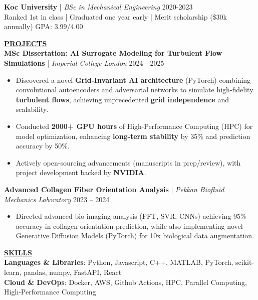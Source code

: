\documentclass{article}
\newlength{\remaining}
\renewcommand{\section}[1]{
  \vspace{1.0em}\setlength{\remaining}{\textwidth-\widthof{\uppercase{#1}}}
    \noindent\underline{\fontsize{10}{15}\bfseries\uppercase{#1}\hspace*{\remaining}} \\
}
\renewcommand{\subsection}[3]{
    \noindent\textbf{#1} | \emph{#2} \hfill #3  
}
\begin{document}
    \vspace{0.25em}

    \subsection{Koc University}{BSc in Mechanical Engineering}{2020-2023} \\
    Ranked 1st in class | Graduated one year early | Merit scholarship (\$30k annually) \hfill GPA: 3.99/4.00


    \section{Projects}
    \subsection{MSc Dissertation: AI Surrogate Modeling for Turbulent Flow Simulations}{Imperial College London}{2024 - 2025} 
    \begin{itemize} 
        \item Discovered a novel \textbf{Grid-Invariant AI architecture} (PyTorch) combining convolutional autoencoders and adversarial networks to simulate high-fidelity \textbf{turbulent flows}, achieving unprecedented \textbf{grid independence} and scalability.
        \item Conducted \textbf{2000+ GPU hours} of High-Performance Computing (HPC) for model optimization, enhancing \textbf{long-term stability} by 35\% and prediction accuracy by 50\%.
        \item Actively open-sourcing advancements (manuscripts in prep/review), with project development backed by \textbf{NVIDIA}.
    \end{itemize}

    \subsection{Advanced Collagen Fiber Orientation Analysis}{Pekkan Biofluid Mechanics Laboratory}{2023 – 2024}
    \begin{itemize}
        \item Directed advanced bio-imaging analysis (FFT, SVR, CNNs) achieving 95\% accuracy in collagen orientation prediction, while also implementing novel Generative Diffusion Models (PyTorch) for 10x biological data augmentation.
    \end{itemize}

    \section{Skills}
    \textbf{Languages \& Libraries}: Python, Javascript, C++, MATLAB, PyTorch, scikit-learn, pandas, numpy, FastAPI, React \\
\textbf{Cloud \& DevOps}: Docker, AWS, Github Actions, HPC, Parallel Computing, High-Performance Computing
\end{document}
